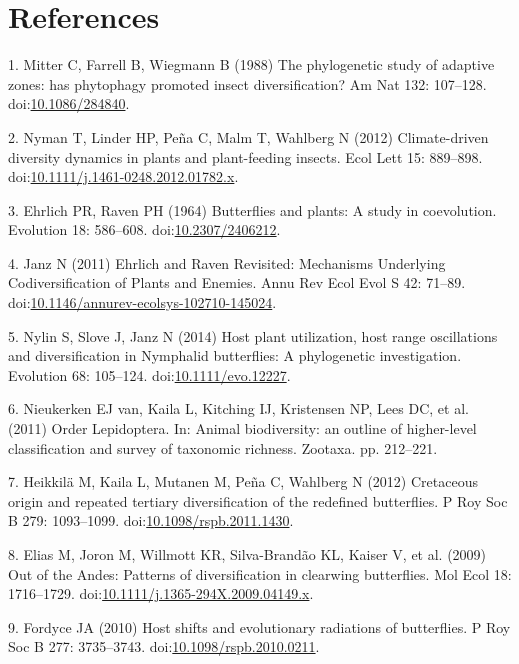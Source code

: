 \documentclass[10pt]{article}
\begin{document}
\section*{References}
1. Mitter C, Farrell B, Wiegmann B (1988) The phylogenetic study of
adaptive zones: has phytophagy promoted insect diversification? Am Nat
132: 107--128.
doi:\href{http://dx.doi.org/10.1086/284840}{10.1086/284840}.

2. Nyman T, Linder HP, Pe\~na C, Malm T, Wahlberg N (2012) Climate-driven
diversity dynamics in plants and plant-feeding insects. Ecol Lett 15:
889--898.
doi:\href{http://dx.doi.org/10.1111/j.1461-0248.2012.01782.x}{10.1111/j.1461-0248.2012.01782.x}.

3. Ehrlich PR, Raven PH (1964) Butterflies and plants: A study in
coevolution. Evolution 18: 586--608.
doi:\href{http://dx.doi.org/10.2307/2406212}{10.2307/2406212}.

4. Janz N (2011) Ehrlich and Raven Revisited: Mechanisms Underlying
Codiversification of Plants and Enemies. Annu Rev Ecol Evol S 42:
71--89.
doi:\href{http://dx.doi.org/10.1146/annurev-ecolsys-102710-145024}{10.1146/annurev-ecolsys-102710-145024}.

5. Nylin S, Slove J, Janz N (2014) Host plant utilization, host range
oscillations and diversification in Nymphalid butterflies: A
phylogenetic investigation. Evolution 68: 105--124.
doi:\href{http://dx.doi.org/10.1111/evo.12227}{10.1111/evo.12227}.

6. Nieukerken EJ van, Kaila L, Kitching IJ, Kristensen NP, Lees DC, et
al. (2011) Order Lepidoptera. In: Animal biodiversity: an outline of
higher-level classification and survey of taxonomic richness. Zootaxa.
pp. 212--221.

7. Heikkil\"a M, Kaila L, Mutanen M, Pe\~na C, Wahlberg N (2012) Cretaceous
origin and repeated tertiary diversification of the redefined
butterflies. P Roy Soc B 279: 1093--1099.
doi:\href{http://dx.doi.org/10.1098/rspb.2011.1430}{10.1098/rspb.2011.1430}.

8. Elias M, Joron M, Willmott KR, Silva-Brand\~ao KL, Kaiser V, et al.
(2009) Out of the Andes: Patterns of diversification in clearwing
butterflies. Mol Ecol 18: 1716--1729.
doi:\href{http://dx.doi.org/10.1111/j.1365-294X.2009.04149.x}{10.1111/j.1365-294X.2009.04149.x}.

9. Fordyce JA (2010) Host shifts and evolutionary radiations of
butterflies. P Roy Soc B 277: 3735--3743.
doi:\href{http://dx.doi.org/10.1098/rspb.2010.0211}{10.1098/rspb.2010.0211}.
\end{document}
